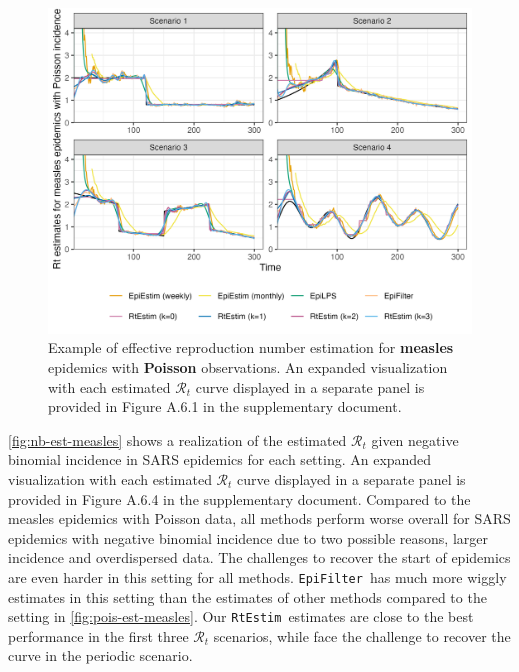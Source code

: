 \documentclass[10pt,letterpaper]{article}
\def\RtEstim{\texttt{RtEstim}}
\def\EpiEstim{\texttt{EpiEstim}}
\def\EpiFilter{\texttt{EpiFilter}}
\def\calR{\mathcal{R}}
\begin{document}
\begin{figure}[!ht]
  \centering
  \includegraphics[width=.99\textwidth]{fig/fig_res_pois_measles.png}
  \caption{Example of effective reproduction number estimation for \textbf{measles} 
    epidemics with \textbf{Poisson} observations. An expanded visualization with each estimated 
    $\calR_t$ curve displayed in a separate panel is provided in Figure A.6.1 
    in the supplementary document.}
  \label{fig:pois-est-measles}
\end{figure}

\autoref{fig:nb-est-measles} shows a realization of the estimated $\calR_t$ given
negative binomial incidence in SARS epidemics for each setting. An expanded 
visualization with each estimated $\calR_t$ curve displayed in a separate panel is 
provided in Figure A.6.4 in the supplementary document. Compared to the measles epidemics 
with Poisson data, all methods perform worse overall for SARS epidemics with negative 
binomial incidence due to two possible reasons, larger incidence and overdispersed data. 
The challenges to recover the start of epidemics are even harder in this setting for 
all methods. \EpiFilter\ has much more wiggly estimates in this setting than the estimates of other 
methods compared to the setting in \autoref{fig:pois-est-measles}. Our \RtEstim\ 
estimates are close to the best performance in the first three $\calR_t$ scenarios, 
while face the challenge to recover the curve in the periodic scenario. 

\end{document}
